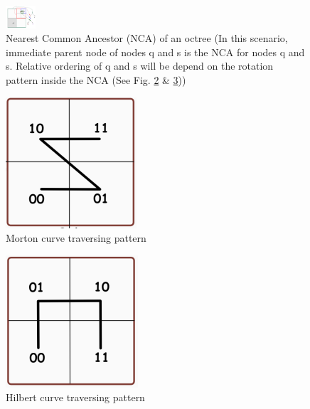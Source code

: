 \documentclass[a0,landscape]{a0poster}
\begin{document}
\begin{multicols}{4}
\begin{figure}[H]
\centering
\includegraphics[width=0.1\textwidth,keepaspectratio]{nca.jpg}
\caption{Nearest Common Ancestor (NCA) of an octree (In this scenario, immediate parent node of nodes q and s is the NCA for nodes q and s. Relative ordering of q and s will be depend on the rotation pattern inside the NCA (See Fig. \ref{zcell} \& \ref{hilbertcell})) \label{NCA}} 
\end{figure}

\begin{multicols}{2}
\begin{figure}[H]
\centering
\includegraphics[width=0.5\columnwidth,keepaspectratio]{zcell.png}
\caption{Morton curve traversing pattern \label{zcell}}
\end{figure}
\columnbreak

\begin{figure}[H]
\centering
\includegraphics[width=0.5\columnwidth,keepaspectratio]{hilbertcell.png}
\caption{Hilbert curve traversing pattern \label{hilbertcell}}
\end{figure}
\end{multicols}
 





\end{multicols}
\end{document}
